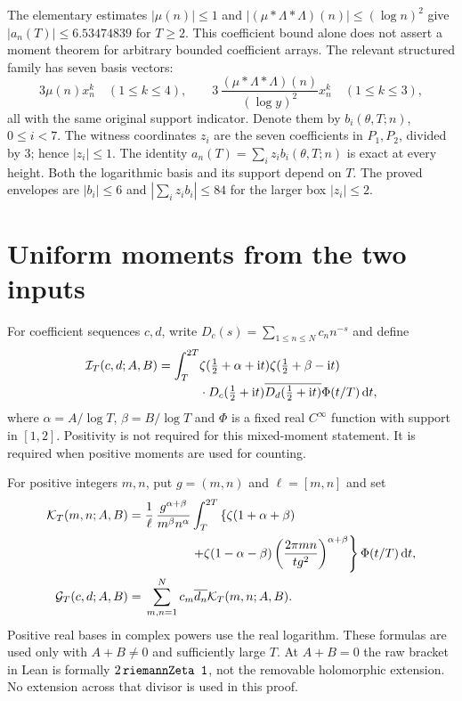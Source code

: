 \documentclass[11pt]{article}
\theoremstyle{definition}
\newcommand{\ii}{\mathrm i}
\newcommand{\dd}{\,\mathrm d}
\begin{document}
The elementary estimates $|\mu(n)|\le1$ and
$|(\mu*\Lambda*\Lambda)(n)|\le(\log n)^2$ give
$|a_n(T)|\le6.53474839$ for $T\ge2$. This coefficient bound alone does
not assert a moment theorem for arbitrary bounded coefficient arrays.
The relevant structured family has seven basis vectors:
\[
 3\mu(n)x_n^k\quad(1\le k\le4),\qquad
 3\,\frac{(\mu*\Lambda*\Lambda)(n)}{(\log y)^2}x_n^k
       \quad(1\le k\le3),
\]
all with the same original support indicator. Denote them by
$b_i(\theta,T;n)$, $0\le i<7$. The witness coordinates $z_i$ are the
seven coefficients in $P_1,P_2$, divided by $3$; hence $|z_i|\le1$.
The identity $a_n(T)=\sum_i z_i b_i(\theta,T;n)$ is exact at every
height. Both the logarithmic basis and its support depend on $T$.
The proved envelopes are $|b_i|\le6$ and
$|\sum_i z_i b_i|\le84$ for the larger box $|z_i|\le2$.

\section{Uniform moments from the two inputs}\label{sec:moment}

For coefficient sequences $c,d$, write
$D_c(s)=\sum_{1\le n\le N}c_n n^{-s}$ and define
\begin{align}
 \mathcal I_T(c,d;A,B)
 =\int_T^{2T}&\zeta(\tfrac12+\alpha+\ii t)
              \zeta(\tfrac12+\beta-\ii t)\notag\\[-2pt]
 &{}\cdot D_c(\tfrac12+\ii t)\overline{D_d(\tfrac12+\ii t)}
                     \Phi(t/T)\dd t,\label{eq:moment-pair}
\end{align}
where $\alpha=A/\log T$, $\beta=B/\log T$ and $\Phi$ is a fixed real
$C^\infty$ function with support in $[1,2]$. Positivity is not required
for this mixed-moment statement. It is required when positive moments
are used for counting.

For positive integers $m,n$, put $g=(m,n)$ and $\ell=[m,n]$ and set
\begin{align}
 \mathcal K_T(m,n;A,B)
 ={}&\frac1\ell\,\frac{g^{\alpha+\beta}}{m^\beta n^\alpha}
 \int_T^{2T}\left\{\zeta(1+\alpha+\beta)\right.\notag\\
 &\left.\hspace{13mm}+
 \zeta(1-\alpha-\beta)
       \left(\frac{2\pi mn}{t g^2}\right)^{\alpha+\beta}\right\}
                   \Phi(t/T)\dd t,\label{eq:kernel}\\
 \mathcal G_T(c,d;A,B)
 ={}&\sum_{m,n=1}^N c_m\overline{d_n}\mathcal K_T(m,n;A,B).\notag
\end{align}
Positive real bases in complex powers use the real logarithm.
These formulas are used only with $A+B\ne0$ and sufficiently large $T$.
At $A+B=0$ the raw bracket in Lean is formally
$2\,\text{\texttt{riemannZeta 1}}$, not the removable holomorphic extension.
No extension across that divisor is used in this proof.
\end{document}
